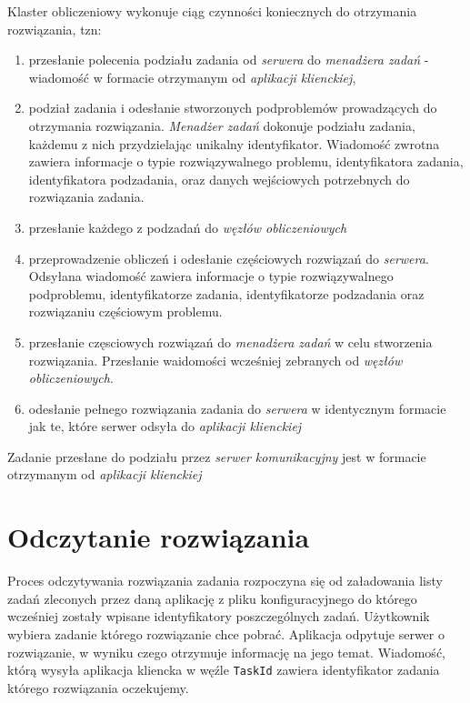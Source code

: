 \documentclass[12pt,a4paper,titlepage]{report}
\begin{document}
    
    Klaster obliczeniowy wykonuje ciąg czynności koniecznych do otrzymania rozwiązania, tzn:
	\begin{enumerate}[(1)]
		\item przesłanie polecenia podziału zadania od \textit{serwera} do \textit{menadżera zadań} - wiadomość w formacie otrzymanym od
		\textit{aplikacji klienckiej},
		\item podział zadania i odesłanie stworzonych podproblemów prowadzących do otrzymania rozwiązania. \textit{Menadżer zadań} dokonuje podziału zadania, każdemu z nich przydzielając unikalny identyfikator. Wiadomość zwrotna zawiera informacje o 
		typie rozwiązywalnego problemu, identyfikatora zadania, identyfikatora podzadania, oraz danych wejściowych potrzebnych do rozwiązania zadania.
		
		
		
		\item przesłanie każdego z podzadań do \textit{węzłów obliczeniowych}
		\item przeprowadzenie obliczeń i odesłanie częściowych rozwiązań do \textit{serwera}. Odsyłana wiadomość zawiera informacje o 
		typie rozwiązywalnego podproblemu, identyfikatorze zadania, identyfikatorze podzadania oraz rozwiązaniu częściowym problemu.
		\item przesłanie częsciowych rozwiązań do \textit{menadżera zadań} w celu stworzenia rozwiązania. Przesłanie waidomości wcześniej zebranych od \textit{węzłów obliczeniowych}.
		\item odesłanie pełnego rozwiązania zadania do \textit{serwera} w identycznym formacie jak te, które serwer odsyła do \textit{aplikacji klienckiej}
	\end{enumerate}

	Zadanie przesłane do podziału przez \textit{serwer komunikacyjny} jest w formacie otrzymanym od \textit{aplikacji klienckiej}    
    
    \section{Odczytanie rozwiązania}	
	Proces odczytywania rozwiązania zadania rozpoczyna się od załadowania listy zadań zleconych przez daną aplikację z pliku konfiguracyjnego do którego wcześniej zostały wpisane identyfikatory poszczególnych zadań. Użytkownik wybiera zadanie którego rozwiązanie
	chce pobrać. Aplikacja odpytuje serwer o rozwiązanie, w wyniku czego otrzymuje informację na jego temat. Wiadomość, którą wysyła aplikacja kliencka w węźle \verb+TaskId+ zawiera identyfikator zadania którego rozwiązania oczekujemy.\\
\end{document}
